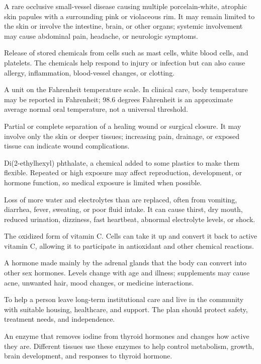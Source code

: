  A rare occlusive small-vessel disease causing multiple porcelain-white, atrophic skin papules with a surrounding pink or violaceous rim. It may remain limited to the skin or involve the intestine, brain, or other organs; systemic involvement may cause abdominal pain, headache, or neurologic symptoms.

 Release of stored chemicals from cells such as mast cells, white blood cells, and platelets. The chemicals help respond to injury or infection but can also cause allergy, inflammation, blood-vessel changes, or clotting.

 A unit on the Fahrenheit temperature scale. In clinical care, body temperature may be reported in Fahrenheit; 98.6 degrees Fahrenheit is an approximate average normal oral temperature, not a universal threshold.

 Partial or complete separation of a healing wound or surgical closure. It may involve only the skin or deeper tissues; increasing pain, drainage, or exposed tissue can indicate wound complications.

 Di(2-ethylhexyl) phthalate, a chemical added to some plastics to make them flexible. Repeated or high exposure may affect reproduction, development, or hormone function, so medical exposure is limited when possible.

 Loss of more water and electrolytes than are replaced, often from vomiting, diarrhea, fever, sweating, or poor fluid intake. It can cause thirst, dry mouth, reduced urination, dizziness, fast heartbeat, abnormal electrolyte levels, or shock.

 The oxidized form of vitamin C. Cells can take it up and convert it back to active vitamin C, allowing it to participate in antioxidant and other chemical reactions.

 A hormone made mainly by the adrenal glands that the body can convert into other sex hormones. Levels change with age and illness; supplements may cause acne, unwanted hair, mood changes, or medicine interactions.

 To help a person leave long-term institutional care and live in the community with suitable housing, healthcare, and support. The plan should protect safety, treatment needs, and independence.

 An enzyme that removes iodine from thyroid hormones and changes how active they are. Different tissues use these enzymes to help control metabolism, growth, brain development, and responses to thyroid hormone.

